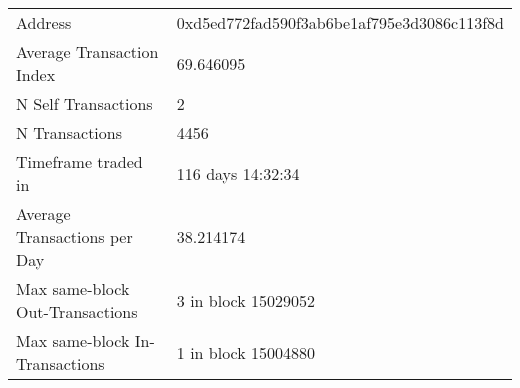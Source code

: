 \begin{tabular}{ll}
\toprule
                        Address & 0xd5ed772fad590f3ab6be1af795e3d3086c113f8d \\
      Average Transaction Index &                                  69.646095 \\
            N Self Transactions &                                          2 \\
                 N Transactions &                                       4456 \\
            Timeframe traded in &                          116 days 14:32:34 \\
   Average Transactions per Day &                                  38.214174 \\
Max same-block Out-Transactions &                        3 in block 15029052 \\
 Max same-block In-Transactions &                        1 in block 15004880 \\
\bottomrule
\end{tabular}
